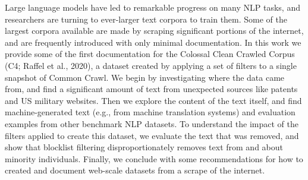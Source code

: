 Large language models have led to remarkable progress on many NLP tasks, and researchers are turning to ever-larger text corpora to train them. Some of the largest corpora available are made by scraping significant portions of the internet, and are frequently introduced with only minimal documentation. In this work we provide some of the first documentation for the Colossal Clean Crawled Corpus (C4; Raffel et al., 2020), a dataset created by applying a set of filters to a single snapshot of Common Crawl. We begin by investigating where the data came from, and find a significant amount of text from unexpected sources like patents and US military websites. Then we explore the content of the text itself, and find machine-generated text (e.g., from machine translation systems) and evaluation examples from other benchmark NLP datasets. To understand the impact of the filters applied to create this dataset, we evaluate the text that was removed, and show that blocklist filtering disproportionately removes text from and about minority individuals. Finally, we conclude with some recommendations for how to created and document web-scale datasets from a scrape of the internet.
